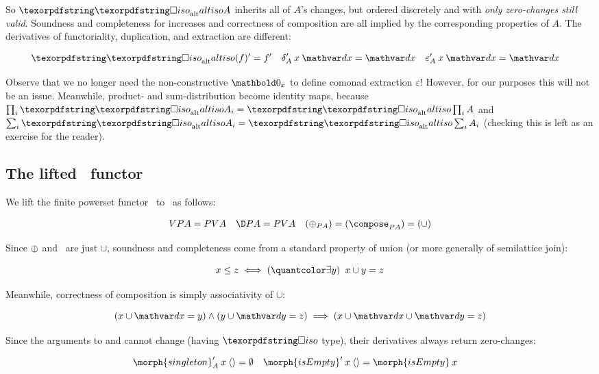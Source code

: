 \noindent
So $\altiso A$ inherits all of $A$'s changes, but ordered discretely and with
\emph{only zero-changes still valid}. Soundness and completeness for increases
and correctness of composition are all implied by the corresponding properties
of $A$. The derivatives of functoriality, duplication, and extraction are
different:

\nopagebreak[2]
\begin{align*}
  \deriv{\altiso(f)} &= \deriv f
  & \deriv\delta_A \<x\<\dx &= \dx
  & \deriv\varepsilon_A \<x\<\dx &= \dx
\end{align*}

\noindent
Observe that we no longer need the non-constructive $\zero_x$ to define comonad
extraction $\varepsilon$! However, for our purposes this will not be an issue.
Meanwhile, product- and sum-distribution become identity maps, because $\prod_i
\altiso A_i = \altiso \prod_i A$ and $\sum_i \altiso A_i = \altiso \sum_i
A_i$ (checking this is left as an exercise for the reader).


\subsection{The lifted \pfin\ functor}
\label{sec:CP-pfin}

We lift the finite powerset functor \pfin\ to \CP\ as follows:

\nopagebreak[2]
\begin{align}
  \vals{\pfinof A} &= \pfinof{\vals A} &
  \chgs{\pfinof A} &= \pfinof{\vals A} &
  (\updfn_{\pfinof A}) = (\composefn_{\pfinof A}) = ({\cup})
  \label{eqn:CP-pfin}
\end{align}

\noindent Since ${\mathbin{\oplus}}$ and \composefn\ are just $\cup$, soundness and
completeness come from a standard property of union (or more generally of
semilattice join):

\nopagebreak[2]
\[ x \le z \iff \ex{y} x \cup y = z \]

\noindent Meanwhile, correctness of composition is simply associativity of
$\cup$:

\nopagebreak[2]
\[ (x \cup \dx = y) \wedge (y \cup \dy = z) \implies (x \cup \dx \cup \dy = z) \]

\noindent
Since the arguments to  and  cannot change
(having $\iso$ type), their derivatives always return zero-changes:

\nopagebreak[2]
\begin{align*}
  \deriv{\morph{singleton}}_A \<x \<\tuple{} &= \emptyset &
  \deriv{\morph{isEmpty}} \<x \<\tuple{} &= \morph{isEmpty} \< x
\end{align*}

